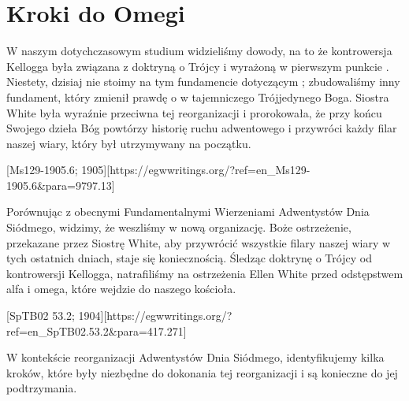 \chapter{Kroki do Omegi}

W naszym dotychczasowym studium widzieliśmy dowody, na to że kontrowersja Kellogga była związana z doktryną o Trójcy i  wyrażoną w pierwszym punkcie . Niestety, dzisiaj nie stoimy na tym fundamencie dotyczącym ; zbudowaliśmy inny fundament, który zmienił prawdę o  w tajemniczego Trójjedynego Boga. Siostra White była wyraźnie przeciwna tej reorganizacji i prorokowała, że przy końcu Swojego dzieła Bóg powtórzy historię ruchu adwentowego i przywróci każdy filar naszej wiary, który był utrzymywany na początku.

[Ms129-1905.6; 1905][https://egwwritings.org/?ref=en\_Ms129-1905.6&para=9797.13]

Porównując  z obecnymi Fundamentalnymi Wierzeniami Adwentystów Dnia Siódmego, widzimy, że weszliśmy w nową organizację. Boże ostrzeżenie, przekazane przez Siostrę White, aby przywrócić wszystkie filary naszej wiary w tych ostatnich dniach, staje się koniecznością. Śledząc doktrynę o Trójcy od kontrowersji Kellogga, natrafiliśmy na ostrzeżenia Ellen White przed odstępstwem alfa i omega, które wejdzie do naszego kościoła.

[SpTB02 53.2; 1904][https://egwwritings.org/?ref=en\_SpTB02.53.2&para=417.271]

W kontekście reorganizacji Adwentystów Dnia Siódmego, identyfikujemy kilka kroków, które były niezbędne do dokonania tej reorganizacji i są konieczne do jej podtrzymania.

